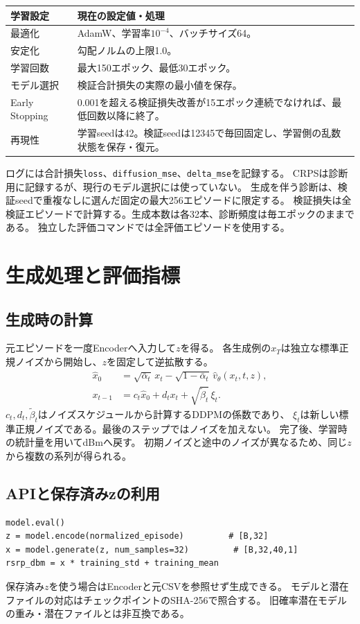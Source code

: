 \documentclass[a4paper,10pt]{article}
\begin{document}
\begin{center}\small
\begin{tabularx}{\linewidth}{@{}lY@{}}\toprule
学習設定 & 現在の設定値・処理\\\midrule
最適化 & AdamW、学習率$10^{-4}$、バッチサイズ64。\\
安定化 & 勾配ノルムの上限1.0。\\
学習回数 & 最大150エポック、最低30エポック。\\
モデル選択 & 検証合計損失の実際の最小値を保存。\\
Early Stopping & 0.001を超える検証損失改善が15エポック連続でなければ、最低回数以降に終了。\\
再現性 & 学習seedは42。検証seedは12345で毎回固定し、学習側の乱数状態を保存・復元。\\\bottomrule
\end{tabularx}\end{center}
ログには合計損失\texttt{loss}、\texttt{diffusion\_mse}、\texttt{delta\_mse}を記録する。
CRPSは診断用に記録するが、現行のモデル選択には使っていない。
生成を伴う診断は、検証seedで重複なしに選んだ固定の最大256エピソードに限定する。
検証損失は全検証エピソードで計算する。生成本数は各32本、診断頻度は毎エポックのままである。
独立した評価コマンドでは全評価エピソードを使用する。

\newpage
\section{生成処理と評価指標}
\subsection{生成時の計算}
元エピソードを一度Encoderへ入力して$z$を得る。
各生成例の$x_T$は独立な標準正規ノイズから開始し、$z$を固定して逆拡散する。
\begin{align}
 \widehat x_0&=\sqrt{\bar\alpha_t}\,x_t
              -\sqrt{1-\bar\alpha_t}\,\hat v_\theta(x_t,t,z),\\
 x_{t-1}&=c_t\widehat x_0+d_tx_t+\sqrt{\widetilde\beta_t}\,\xi_t.
\end{align}
$c_t,d_t,\widetilde\beta_t$はノイズスケジュールから計算するDDPMの係数であり、
$\xi_t$は新しい標準正規ノイズである。最後のステップではノイズを加えない。
完了後、学習時の統計量を用いてdBmへ戻す。
初期ノイズと途中のノイズが異なるため、同じ$z$から複数の系列が得られる。

\subsection{APIと保存済みzの利用}
\begin{verbatim}
model.eval()
z = model.encode(normalized_episode)         # [B,32]
x = model.generate(z, num_samples=32)         # [B,32,40,1]
rsrp_dbm = x * training_std + training_mean
\end{verbatim}
保存済み$z$を使う場合はEncoderと元CSVを参照せず生成できる。
モデルと潜在ファイルの対応はチェックポイントのSHA-256で照合する。
旧確率潜在モデルの重み・潜在ファイルとは非互換である。
\end{document}
